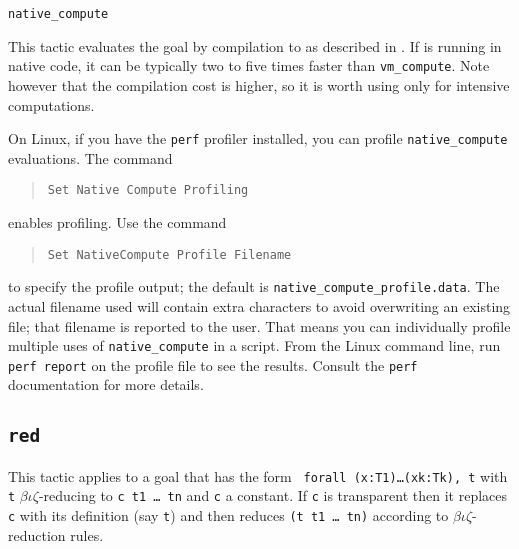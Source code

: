 \begin{coq_example*}
\begin{Variants}
\item {\tt native\_compute}  

  This tactic evaluates the goal by compilation to \ocaml{} as described in
  \cite{FullReduction}. If \Coq{} is running in native code, it can be typically
  two to five times faster than {\tt vm\_compute}. Note however that the
  compilation cost is higher, so it is worth using only for intensive
  computations.

  On Linux, if you have the {\tt perf} profiler installed, you can profile {\tt native\_compute} evaluations. 
  The command
  \begin{quote}
    {\tt Set Native Compute Profiling}
  \end{quote}
  enables profiling. Use the command
  \begin{quote}
    {\tt Set NativeCompute Profile Filename \str}
  \end{quote}
  to specify the profile output; the default is {\tt native\_compute\_profile.data}. The actual filename used 
  will contain extra characters to avoid overwriting an existing file; that filename is reported to the user. That means
  you can individually profile multiple uses of {\tt native\_compute} in a script. From the Linux command line, run {\tt perf report} on
  the profile file to see the results. Consult the {\tt perf} documentation for more details.

\end{Variants}

%


\subsection{\tt red}

This tactic applies to a goal that has the form {\tt
  forall (x:T1)\dots(xk:Tk), t} with {\tt t}
$\beta\iota\zeta$-reducing to {\tt c t1 \dots\ tn} and {\tt c} a
constant.  If
{\tt c} is transparent then it replaces {\tt c} with its definition
(say {\tt t}) and then reduces {\tt (t t1 \dots\ tn)} according to
$\beta\iota\zeta$-reduction rules.

\begin{ErrMsgs}
\item {}
\end{ErrMsgs}


\end{coq_example*}
